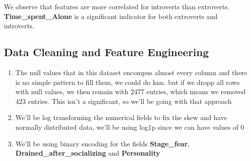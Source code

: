 \documentclass[
]{article}
\begin{document}
We observe that features are more correlated for introverts than
extroverts. \textbf{Time\_spent\_Alone} is a significant indicator for
both extroverts and introverts.

\hypertarget{data-cleaning-and-feature-engineering}{%
\subsection{Data Cleaning and Feature
Engineering}\label{data-cleaning-and-feature-engineering}}

\begin{enumerate}
\def\labelenumi{\arabic{enumi}.}
\item
  The null values that in this dataset encompus almost every column and
  there is no simple pattern to fill them, we could do knn. but if we
  dropp all rows with null values, we then remain with 2477 entries,
  which means we removed 423 entries. This isn't a significant, so we'll
  be going with that approach
\item
  We'll be log transforming the numerical fields to fix the skew and
  have normally distributed data, we'll be using log1p since we can have
  values of 0
\item
  We'll be using binary encoding for the fields \textbf{Stage\_fear},
  \textbf{Drained\_after\_socializing} and \textbf{Personality}


\end{enumerate}
\end{document}
